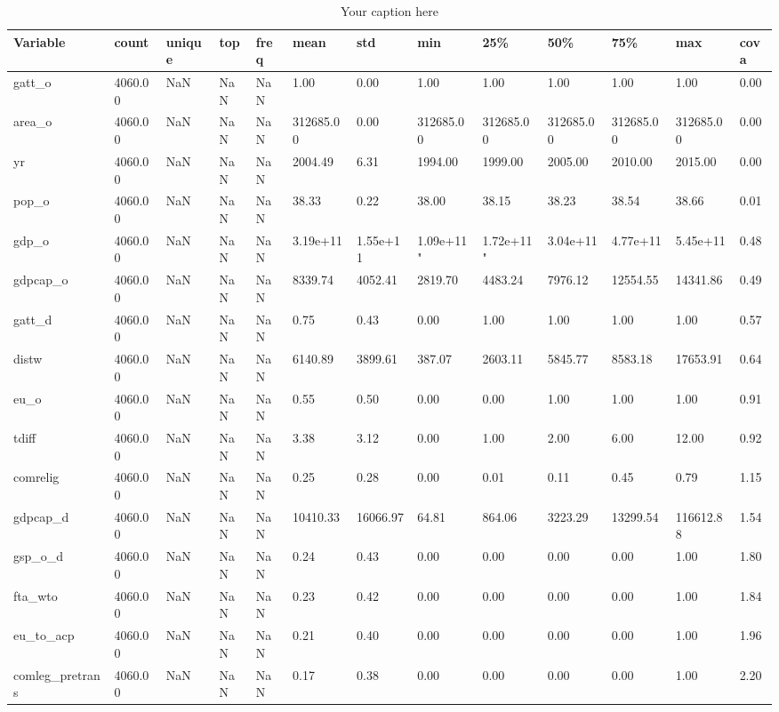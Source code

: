 \documentclass{Trade_template}
\numberwithin{equation}{section}
\begin{document}
\begin{table}
    \centering
    \caption{Your caption here}
\tiny{
\begin{tabularx}{\textwidth}{@{} L *{12}{Y}  @{}}
\toprule
Variable & count & unique & top & freq & mean & std & min & 25\% & 50\% & 75\% & max & cova  \\ \midrule
gatt\_o & 4060.00 & NaN & NaN & NaN & 1.00 & 0.00 & 1.00 & 1.00 & 1.00 & 1.00 & 1.00 & 0.00 \\
area\_o & 4060.00 & NaN & NaN & NaN & 312685.00 & 0.00 & 312685.00 & 312685.00 & 312685.00 & 312685.00 & 312685.00 & 0.00 \\
yr & 4060.00 & NaN & NaN & NaN & 2004.49 & 6.31 & 1994.00 & 1999.00 & 2005.00 & 2010.00 & 2015.00 & 0.00 \\
pop\_o & 4060.00 & NaN & NaN & NaN & 38.33 & 0.22 & 38.00 & 38.15 & 38.23 & 38.54 & 38.66 & 0.01 \\
gdp\_o & 4060.00 & NaN & NaN & NaN & 3.19e+11 & 1.55e+11 & 1.09e+11" & 1.72e+11" & 3.04e+11 & 4.77e+11 & 5.45e+11 & 0.48 \\
gdpcap\_o & 4060.00 & NaN & NaN & NaN & 8339.74 & 4052.41 & 2819.70 & 4483.24 & 7976.12 & 12554.55 & 14341.86 & 0.49 \\
gatt\_d & 4060.00 & NaN & NaN & NaN & 0.75 & 0.43 & 0.00 & 1.00 & 1.00 & 1.00 & 1.00 & 0.57 \\
distw & 4060.00 & NaN & NaN & NaN & 6140.89 & 3899.61 & 387.07 & 2603.11 & 5845.77 & 8583.18 & 17653.91 & 0.64 \\
eu\_o & 4060.00 & NaN & NaN & NaN & 0.55 & 0.50 & 0.00 & 0.00 & 1.00 & 1.00 & 1.00 & 0.91 \\
tdiff & 4060.00 & NaN & NaN & NaN & 3.38 & 3.12 & 0.00 & 1.00 & 2.00 & 6.00 & 12.00 & 0.92 \\
comrelig & 4060.00 & NaN & NaN & NaN & 0.25 & 0.28 & 0.00 & 0.01 & 0.11 & 0.45 & 0.79 & 1.15 \\
gdpcap\_d & 4060.00 & NaN & NaN & NaN & 10410.33 & 16066.97 & 64.81 & 864.06 & 3223.29 & 13299.54 & 116612.88 & 1.54 \\
gsp\_o\_d & 4060.00 & NaN & NaN & NaN & 0.24 & 0.43 & 0.00 & 0.00 & 0.00 & 0.00 & 1.00 & 1.80 \\
fta\_wto & 4060.00 & NaN & NaN & NaN & 0.23 & 0.42 & 0.00 & 0.00 & 0.00 & 0.00 & 1.00 & 1.84 \\
eu\_to\_acp & 4060.00 & NaN & NaN & NaN & 0.21 & 0.40 & 0.00 & 0.00 & 0.00 & 0.00 & 1.00 & 1.96 \\
comleg\_pretrans & 4060.00 & NaN & NaN & NaN & 0.17 & 0.38 & 0.00 & 0.00 & 0.00 & 0.00 & 1.00 & 2.20 \\

\end{tabularx}}
\end{table}
\end{document}
